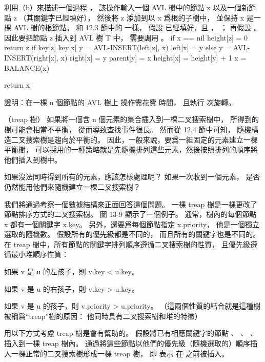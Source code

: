 \startitem%
利用（b）來描述一個過程 ，
該操作輸入一個 AVL 樹中的節點 x 以及一個新節點 z （其關鍵字已經填好），
然後將 z 添加到以 x 爲根的子樹中，
並保持 x 是一棵 AVL 樹的根節點。
和 12.3 節中的  一樣，
假設  已經填好，且 ， ；
再假設 。
因此要把節點 z 插入到 AVL 樹 T 中，
需要調用 。
\stopitem
\startANSWER
{}
\startCLRS
if x == nil
	height[z] = 0
	return z
if key[z] \le key[x]
	y = AVL-INSERT(left[x], x)
	left[x] = y
else
	y = AVL-INSERT(right[x], x)
	right[x] = y
	parent[y] = x
	height[x] = height[y] + 1
	x = BALANCE(x)

return x
\stopCLRS
\stopANSWER

\startitem%
證明：在一棵 n 個節點的 AVL 樹上  操作需花費  時間，
且執行  次旋轉。
\stopitem
\startANSWER
\stopANSWER

\stopigBase
\stopPROBLEM

\startPROBLEM
（treap 樹）
如果將一個含 n 個元素的集合插入到一棵二叉搜索樹中，
所得到的樹可能會相當不平衡，
從而導致查找事件很長。
然而從 12.4 節中可知，
隨機構造二叉搜索樹是趨向於平衡的。
因此，一般來說，要爲一組固定的元素建立一棵平衡樹，
可以採用的一種策略就是先隨機排列這些元素，然後按照排列的順序將他們插入到樹中。

如果沒法同時得到所有的元素，應該怎樣處理呢？
如果一次收到一個元素，
是否仍然能用他們來隨機建立一棵二叉搜索樹？

我們將通過考察一個數據結構來正面回答這個問題。
一棵 treap 樹是一棵更改了節點排序方式的二叉搜索樹。
圖 13-9 顯示了一個例子。
通常，樹內的每個節點 x 都有一個關鍵字 x.key。
另外，還要爲每個節點指定 x.priority，
他是一個獨立選取的隨機數。
假設所有的優先級都是不同的，
而且所有的關鍵字也是不同的。
在 treap 樹中，所有節點的關鍵字排列順序遵循二叉搜索樹的性質，
且優先級遵循最小堆順序性質：
\startigBase[2]
\item 如果 v 是 u 的左孩子，則 v.key < u.key。
\item 如果 v 是 u 的右孩子，則 v.key > u.key。
\item 如果 v 是 u 的孩子，則 v.priority > u.priority。
\stopigBase
（這兩個性質的結合就是這種樹被稱爲“treap”樹的原因：
他同時具有二叉搜索樹和堆的特徵）

用以下方式考慮 treap 樹是會有幫助的。
假設將已有相應關鍵字的節點 、 、 \m{\ldots}、  插入到一棵 treap 樹內。
通過將這些節點以他們的優先級（隨機選取的）順序插入一棵正常的二叉搜索樹形成一棵 treap 樹，
即  表示  在  之前被插入。

